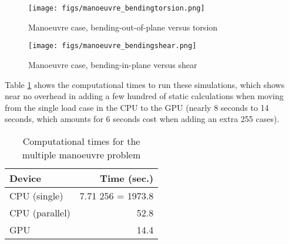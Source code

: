 \documentclass[11pt]{article}
\begin{document}
\begin{figure}[htbp]
\centering
\texttt{[image: figs/manoeuvre\_bendingtorsion.png]}
\caption{\label{fig:orgd2e3b7b}Manoeuvre case, bending-out-of-plane versus torsion}
\end{figure}

\begin{figure}[htbp]
\centering
\texttt{[image: figs/manoeuvre\_bendingshear.png]}
\caption{\label{fig:org41f40e0}Manoeuvre case, bending-in-plane versus shear}
\end{figure}

Table \ref{tab:org71806d6} shows the computational times to run these simulations, which shows near no overhead in adding a few hundred of static calculations when moving from the single load case in the CPU to the GPU (nearly 8 seconds to 14 seconds, which amounts for 6 seconds cost when adding an extra 255 cases).

\begin{table}[htbp]
\caption{\label{tab:org71806d6}Computational times for the multiple manoeuvre problem}
\centering
\begin{tabular}{lr}
Device & Time (sec.)\\[0pt]
\hline
CPU (single) & 7.71 \texttimes{} 256 = 1973.8\\[0pt]
CPU (parallel) & 52.8\\[0pt]
GPU & 14.4\\[0pt]
\end{tabular}
\end{table}
\end{document}
